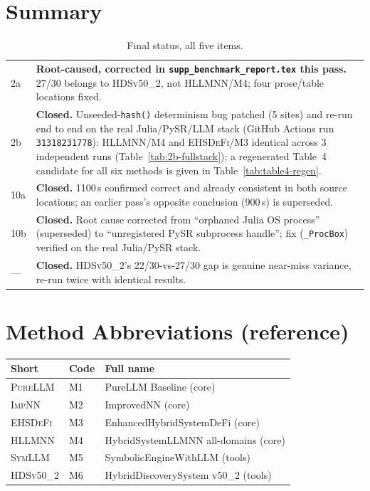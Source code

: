 \documentclass[twoside,11pt]{article}
\newcommand{\PureLLM}{\textsc{PureLLM}}
\newcommand{\INN}{\textsc{ImpNN}}
\newcommand{\EHD}{\textsc{EHSDeFi}}
\newcommand{\HSL}{\textsc{HLLMNN}}
\newcommand{\SEL}{\textsc{SymLLM}}
\newcommand{\HDS}{\textsc{HDSv50\_2}}
\begin{document}
\section{Summary}

\begin{table}[h]
\centering
\caption{Final status, all five items.}
\small
\renewcommand{\arraystretch}{1.3}
\begin{tabular}{L{1.1cm} L{10.9cm}}
\toprule
2a & \textbf{Root-caused, corrected in \texttt{supp\_benchmark\_report.tex}
  this pass.} 27/30 belongs to \HDS, not \HSL/M4; four prose/table
  locations fixed. \\
2b & \textbf{Closed.} Unseeded-\texttt{hash()} determinism bug patched
  (5 sites) and re-run end to end on the real Julia/PySR/LLM stack
  (GitHub Actions run \texttt{31318231778}): \HSL{}/M4 and \EHD{}/M3
  identical across 3 independent runs (Table~\ref{tab:2b-fullstack});
  a regenerated Table~4 candidate for all six methods is given in
  Table~\ref{tab:table4-regen}. \\
10a & \textbf{Closed.} 1100\,s confirmed correct and already consistent
  in both source locations; an earlier pass's opposite conclusion (900\,s)
  is superseded. \\
10b & \textbf{Closed.} Root cause corrected from ``orphaned Julia OS
  process'' (superseded) to ``unregistered PySR subprocess handle'';
  fix (\texttt{\_ProcBox}) verified on the real Julia/PySR stack. \\
--- & \textbf{Closed.} \HDS's 22/30-vs-27/30 gap is genuine near-miss
  variance, re-run twice with identical results. \\
\bottomrule
\end{tabular}
\end{table}

\appendix
\section{Method Abbreviations (reference)}
\label{app:abbrev-ref}
\begin{tabular}{L{1.8cm} L{2.5cm} L{6.0cm}}
\toprule
\textbf{Short} & \textbf{Code} & \textbf{Full name}\\
\midrule
\PureLLM & M1 & PureLLM Baseline (core)\\
\INN     & M2 & ImprovedNN (core)\\
\EHD     & M3 & EnhancedHybridSystemDeFi (core)\\
\HSL     & M4 & HybridSystemLLMNN all-domains (core)\\
\SEL     & M5 & SymbolicEngineWithLLM (tools)\\
\HDS     & M6 & HybridDiscoverySystem v50\_2 (tools)\\
\bottomrule
\end{tabular}
\end{document}
